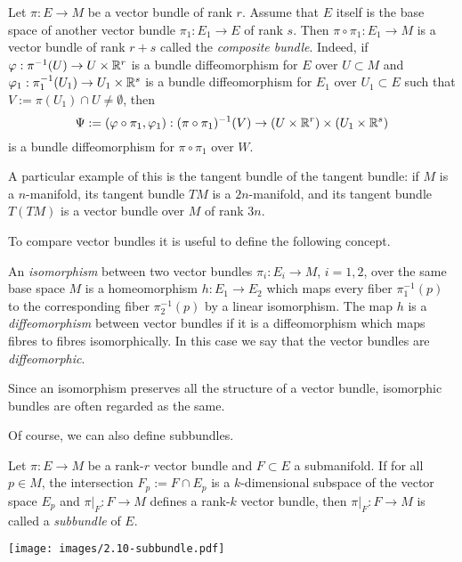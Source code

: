 \begin{example}
	Let $\pi:E \to M$ be a vector bundle of rank $r$.
	Assume that $E$ itself is the base space of another vector bundle $\pi_1: E_1\to E$ of rank $s$.
	Then $\pi\circ\pi_1: E_1 \to M$ is a vector bundle of rank $r+s$ called the \emph{composite bundle}. Indeed, if $\varphi:\pi^{-1}(U)\to U\times\mathbb{R}^r$ is a bundle diffeomorphism for $E$ over $U\subset M$ and $\varphi_1:\pi_1^{-1}(U_1)\to U_1\times\mathbb{R}^s$ is a bundle diffeomorphism for $E_1$ over $U_1\subset E$ such that $V := \pi(U_1)\cap U\neq \emptyset$, then
	\begin{equation}
		\Psi:=(\varphi\circ\pi_1, \varphi_1): (\pi\circ\pi_1)^{-1}(V)\to (U\times\mathbb{R}^r)\times (U_1\times\mathbb{R}^s)
	\end{equation}
	is a bundle diffeomorphism for $\pi\circ\pi_1$ over $W$.

	A particular example of this is the tangent bundle of the tangent bundle: if $M$ is a $n$-manifold, its tangent bundle $TM$ is a $2n$-manifold, and its tangent bundle $T(TM)$ is a vector bundle over $M$ of rank $3n$.
\end{example}

To compare vector bundles it is useful to define the following concept.
\begin{definition}
	An \emph{isomorphism} between two vector bundles $\pi_i: E_i \to M$, $i=1,2$, over the same base space $M$ is a homeomorphism $h:E_1 \to E_2$ which maps every fiber $\pi_1^{-1}(p)$ to the corresponding fiber $\pi_2^{-1}(p)$ by a linear isomorphism.
	The map $h$ is a \emph{diffeomorphism} between vector bundles if it is a diffeomorphism which maps fibres to fibres isomorphically.
	In this case we say that the vector bundles are \emph{diffeomorphic}.
\end{definition}

Since an isomorphism preserves all the structure of a vector bundle, isomorphic bundles are often regarded as the same.

Of course, we can also define subbundles.

\begin{definition}
	Let $\pi:E \to M$ be a rank-$r$ vector bundle and $F\subset E$ a submanifold.
	If for all $p\in M$, the intersection $F_p := F\cap E_p$ is a $k$-dimensional subspace of the vector space $E_p$ and $\pi|_F : F \to M$ defines a rank-$k$ vector bundle, then $\pi|_F: F \to M$ is called a \emph{subbundle} of $E$.
\end{definition}
%
\begin{marginfigure}
	\texttt{[image: images/2.10-subbundle.pdf]}
\end{marginfigure}
%

